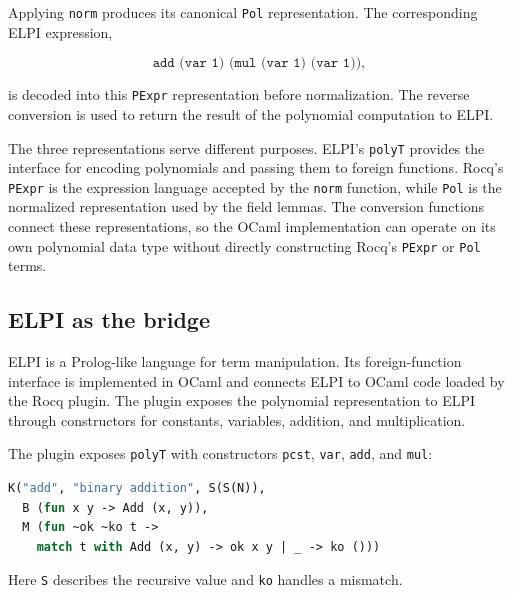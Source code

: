 \documentclass[11pt]{article}
\begin{document}
Applying \texttt{norm} produces its canonical \texttt{Pol} representation.
The corresponding ELPI expression,

$$
  \texttt{add (var 1) (mul (var 1) (var 1))},
$$

is decoded into this \texttt{PExpr} representation before normalization.
The reverse conversion is used to return the result of the polynomial
computation to ELPI.%

The three representations serve different purposes. ELPI's \texttt{polyT} provides the interface for encoding polynomials and passing them to foreign functions. Rocq's \texttt{PExpr} is the expression language accepted by the \texttt{norm} function, while \texttt{Pol} is the normalized representation used by the field lemmas. The conversion functions connect these representations, so the OCaml implementation can operate on its own polynomial data type without directly constructing Rocq's \texttt{PExpr} or \texttt{Pol} terms.

\subsection{ELPI as the bridge}
ELPI is a Prolog-like language for term manipulation. Its foreign-function
interface is implemented in OCaml and connects ELPI to OCaml code loaded by the
Rocq plugin. The plugin exposes the polynomial representation to ELPI through
constructors for constants, variables, addition, and multiplication.

The plugin exposes \texttt{polyT} with constructors \texttt{pcst},
\texttt{var}, \texttt{add}, and \texttt{mul}:
\begin{lstlisting}[language=ML]
K("add", "binary addition", S(S(N)),
  B (fun x y -> Add (x, y)),
  M (fun ~ok ~ko t ->
    match t with Add (x, y) -> ok x y | _ -> ko ()))
\end{lstlisting}
Here \texttt{S} describes the recursive value and \texttt{ko} handles a
mismatch.
\end{document}
